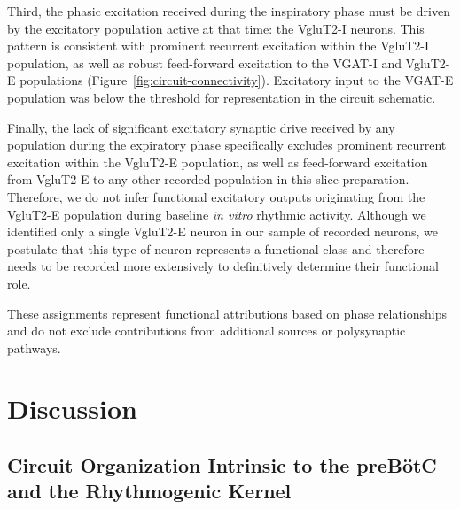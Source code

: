 \documentclass[
]{article}
\newcommand{\figref}[1]{Figure~\ref{#1}}
\begin{document}
Third, the phasic excitation received during the inspiratory phase must be driven by the excitatory population active at that time: the VgluT2-I neurons. This pattern is consistent with prominent recurrent excitation within the VgluT2-I population, as well as robust feed-forward excitation to the VGAT-I and VgluT2-E populations (\figref{fig:circuit-connectivity}). Excitatory input to the VGAT-E population was below the threshold for representation in the circuit schematic.

Finally, the lack of significant excitatory synaptic drive received by any population during the expiratory phase specifically excludes prominent recurrent excitation within the VgluT2-E population, as well as feed-forward excitation from VgluT2-E to any other recorded population in this slice preparation. Therefore, we do not infer functional excitatory outputs originating from the VgluT2-E population during baseline \emph{in vitro} rhythmic activity. Although we identified only a single VgluT2-E neuron in our sample of recorded neurons, we postulate that this type of neuron represents a functional class and therefore needs to be recorded more extensively to definitively determine their functional role.

These assignments represent functional attributions based on phase relationships and do not exclude contributions from additional sources or polysynaptic pathways.

\section{Discussion}

\subsection{Circuit Organization Intrinsic to the preBötC and the Rhythmogenic Kernel}\label{circuit-organization-intrinsic-to-the-prebuxf6tc-in-relation-to-the-rhythmogenic-kernel}
\end{document}
